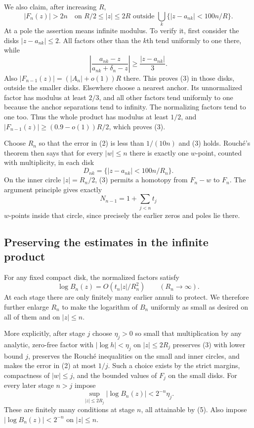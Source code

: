 We also claim, after increasing $R$,
\[
 |F_n(z)|>2n
 \quad\text{on }R/2\le|z|\le2R
 \text{ outside }\bigcup_k\{|z-a_{nk}|<100n/R\}.
 \tag{3}
\]
At a pole the assertion means infinite modulus. To verify it, first consider the disks $|z-a_{nk}|\le2$. All factors other than the $k$th tend uniformly to one there, while
\[
 \left|\frac{a_{nk}-z}{a_{nk}+\delta_n-z}\right|
 \ge\frac{|z-a_{nk}|}{3}.
\]
Also $|F_{n-1}(z)|=(|A_n|+o(1))R$ there. This proves (3) in those disks, outside the smaller disks. Elsewhere choose a nearest anchor. Its unnormalized factor has modulus at least $2/3$, and all other factors tend uniformly to one because the anchor separations tend to infinity. The normalizing factors tend to one too. Thus the whole product has modulus at least $1/2$, and $|F_{n-1}(z)|\ge(0.9-o(1))R/2$, which proves (3).

Choose $R_n$ so that the error in (2) is less than $1/(10n)$ and (3) holds. Rouch\'e's theorem then says that for every $|w|\le n$ there is exactly one $w$-point, counted with multiplicity, in each disk
\[
 D_{nk}=\{|z-a_{nk}|<100n/R_n\}.
\]
On the inner circle $|z|=R_n/2$, (3) permits a homotopy from $F_n-w$ to $F_n$. The argument principle gives exactly
\[
 N_{n-1}=1+\sum_{j<n}t_j
 \tag{4}
\]
$w$-points inside that circle, since precisely the earlier zeros and poles lie there.

\subsection*{Preserving the estimates in the infinite product}
For any fixed compact disk, the normalized factors satisfy
\[
 \log B_n(z)=O(t_n|z|/R_n^2)\qquad(R_n\to\infty).
 \tag{5}
\]
At each stage there are only finitely many earlier annuli to protect. We therefore further enlarge $R_n$ to make the logarithm of $B_n$ uniformly as small as desired on all of them and on $|z|\le n$.

More explicitly, after stage $j$ choose $\eta_j>0$ so small that multiplication by any analytic, zero-free factor with $|\log h|<\eta_j$ on $|z|\le2R_j$ preserves (3) with lower bound $j$, preserves the Rouch\'e inequalities on the small and inner circles, and makes the error in (2) at most $1/j$. Such a choice exists by the strict margins, compactness of $|w|\le j$, and the bounded values of $F_j$ on the small disks. For every later stage $n>j$ impose
\[
 \sup_{|z|\le2R_j}|\log B_n(z)|<2^{-n}\eta_j.
\]
These are finitely many conditions at stage $n$, all attainable by (5). Also impose $|\log B_n(z)|<2^{-n}$ on $|z|\le n$.

